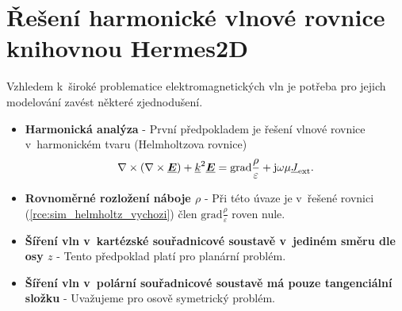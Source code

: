 \section{Řešení harmonické vlnové rovnice knihovnou Hermes2D} \label{sec:sim_hermes2d}
Vzhledem k~široké problematice elektromagnetických vln je potřeba pro jejich modelování zavést některé zjednodušení. 
\begin{itemize}
\item {\bf Harmonická analýza} - První předpokladem je řešení vlnové rovnice v~harmonickém tvaru (Helmholtzova rovnice)
\begin{equation}
	\nabla\times(\nabla\times\mbox{\underline{\boldmath$E$}}) +{\underline{k}}^{2}\mbox{\underline{\boldmath$E$}} = \mathrm{grad}\frac{\rho}{\varepsilon} + \mathrm{j}\omega\mu{\underline{J}}_{\mathrm{ext}}.
    \label{rce:sim_helmholtz_vychozi} 
\end{equation}
\item {\bf Rovnoměrné rozložení náboje $\rho$} - Při této úvaze je v~řešené rovnici (\ref{rce:sim_helmholtz_vychozi}) člen $\mathrm{grad}\frac{\rho}{\varepsilon}$ roven nule.
\item {\bf Šíření vln v~kartézské souřadnicové soustavě v~jediném směru dle osy $z$} - Tento předpoklad platí pro planární problém.
\item {\bf Šíření vln v~polární souřadnicové soustavě má pouze tangenciální složku} - Uvažujeme pro osově symetrický problém.
\end{itemize}

